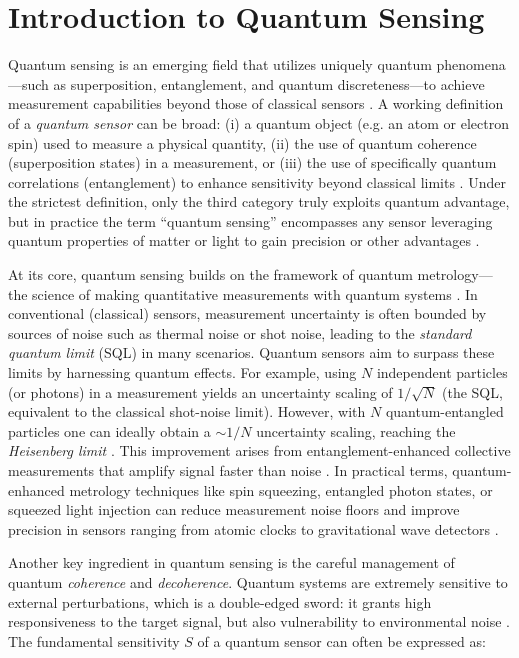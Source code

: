 
\chapter{Introduction to Quantum Sensing}

Quantum sensing is an emerging field that utilizes uniquely quantum
phenomena—such as superposition, entanglement, and quantum
discreteness—to achieve measurement capabilities beyond those of
classical sensors . A working definition of a \emph{quantum sensor}
can be broad: (i) a quantum object (e.g. an atom or electron spin)
used to measure a physical quantity, (ii) the use of quantum coherence
(superposition states) in a measurement, or (iii) the use of
specifically quantum correlations (entanglement) to enhance
sensitivity beyond classical limits . Under the strictest definition,
only the third category truly exploits quantum advantage, but in
practice the term “quantum sensing” encompasses any sensor leveraging
quantum properties of matter or light to gain precision or other
advantages .



At its core, quantum sensing builds on the framework of quantum
metrology—the science of making quantitative measurements with quantum
systems . In conventional (classical) sensors, measurement uncertainty
is often bounded by sources of noise such as thermal noise or shot
noise, leading to the \textit{standard quantum limit} (SQL) in many
scenarios. Quantum sensors aim to surpass these limits by harnessing
quantum effects. For example, using $N$ independent particles (or
photons) in a measurement yields an uncertainty scaling of
$1/\sqrt{N}$ (the SQL, equivalent to the classical shot-noise
limit). However, with $N$ quantum-entangled particles one can ideally
obtain a $\sim 1/N$ uncertainty scaling, reaching the \emph{Heisenberg
limit} . This improvement arises from entanglement-enhanced collective
measurements that amplify signal faster than noise . In practical
terms, quantum-enhanced metrology techniques like spin squeezing,
entangled photon states, or squeezed light injection can reduce
measurement noise floors and improve precision in sensors ranging from
atomic clocks to gravitational wave detectors .



Another key ingredient in quantum sensing is the careful management of
quantum \textit{coherence} and \textit{decoherence}. Quantum systems
are extremely sensitive to external perturbations, which is a
double-edged sword: it grants high responsiveness to the target
signal, but also vulnerability to environmental noise . The
fundamental sensitivity $S$ of a quantum sensor can often be expressed
as:

